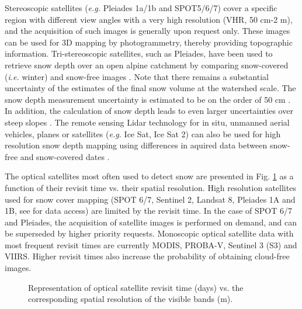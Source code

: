 \documentclass[utf8]{frontiersSCNS} %
\begin{document}


Stereoscopic satellites (\textit{e.g.} Pleiades 1a/1b and SPOT5/6/7) cover a specific region with different view angles with a very high resolution (VHR, 50 cm-2 m), and the acquisition of such images is generally upon request only. These images can be used for 3D mapping by photogrammetry, thereby providing topographic information. Tri-stereoscopic satellites, such as Pleiades, have been used to retrieve snow depth over an open alpine catchment by comparing snow-covered (\textit{i.e.} winter) and snow-free images \citep{Marti_2016}. Note that there remains a substantial uncertainty of the estimates of the final snow volume at the watershed scale. The snow depth measurement uncertainty is estimated to be on the order of 50 cm \citep{Marti_2016}. In addition, the calculation of snow depth leads to even larger uncertainties over steep slopes \citep{Deems_2006}. The remote sensing Lidar technology for in situ, unmanned aerial vehicles, planes or satellites (\textit{e.g.} Ice Sat, Ice Sat 2) can also be used for high resolution snow depth mapping using differences in aquired data between snow-free and snow-covered dates \citep{kwok2008, deems2013}.

The optical satellites most often used to detect snow are presented in Fig. \ref{sat} as a function of their revisit time vs. their spatial resolution.  High resolution satellites used for snow cover mapping (SPOT 6/7, Sentinel 2, Landsat 8, Pleiades 1A and 1B, see \citealp[e.g.][]{Gascoin_2019} for data access) are limited by the revisit time. In the case of SPOT 6/7 and Pleiades, the acquisition of satellite images is performed on demand, and can be superseded by higher priority requests. Monoscopic optical satellite data with most frequent revisit times are currently MODIS, PROBA-V, Sentinel 3 (S3) and VIIRS. Higher revisit times also increase the probability of obtaining cloud-free images. 


\begin{figure}
	\centering
			
	\caption{Representation of optical satellite revisit time (days) vs. the corresponding spatial resolution of the visible bands (m).}\label{sat}
\end{figure}
\end{document}
